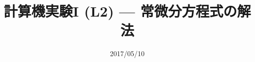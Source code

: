 \documentclass[dvipdfmx]{beamer}
\title{計算機実験I (L2) --- 常微分方程式の解法}
\date{2017/05/10}
\begin{document}
\begin{frame}
  \titlepage
  \tableofcontents
\end{frame}






\end{document}
